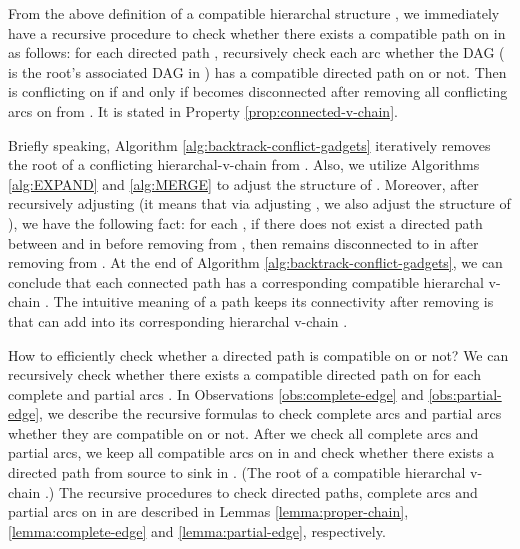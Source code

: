 \documentclass[11pt]{article}
\begin{document}
From the above definition of a compatible hierarchal structure ,
we immediately have a recursive procedure to check whether
there exists a compatible path  on  in  as follows:
for each directed path ,
recursively check each arc  whether the DAG 
( is the root's associated DAG in )
has a compatible directed path on  or not.
Then  is conflicting on  if and only if  becomes disconnected
after removing all conflicting arcs  on  from .
It is stated in Property \ref{prop:connected-v-chain}.


Briefly speaking, Algorithm \ref{alg:backtrack-conflict-gadgets} iteratively
removes the root  of a conflicting hierarchal-v-chain  from .
Also, we utilize Algorithms \ref{alg:EXPAND} and
\ref{alg:MERGE} to adjust the structure of .
Moreover, after recursively adjusting 
(it means that via adjusting , we also
adjust the structure of ), we have the following fact:
for each , if there does not exist
a directed path between  and  in  before removing  from ,
then  remains disconnected to  in  after removing  from .
At the end of Algorithm \ref{alg:backtrack-conflict-gadgets},
we can conclude that
each connected path 
has a corresponding compatible hierarchal v-chain .
The intuitive meaning of a path 
keeps its connectivity after removing 
is that
 can add  into its corresponding hierarchal v-chain .

How to efficiently
check whether a directed path  is compatible on  or not?
We can recursively
check whether there exists a compatible directed path  on 
for each complete and partial arcs .
In Observations \ref{obs:complete-edge} and \ref{obs:partial-edge},
we describe the recursive formulas to
check complete arcs and partial arcs
whether they are compatible on  or not.
After we check all complete arcs and partial arcs,
we keep all compatible arcs on  in  and
check whether there exists a directed path
from source to sink in .
(The root  of a compatible hierarchal v-chain .)
The recursive procedures to check
directed paths, complete arcs and partial arcs on  in 
are described
in Lemmas \ref{lemma:proper-chain}, \ref{lemma:complete-edge} and \ref{lemma:partial-edge},
respectively.
\end{document}
